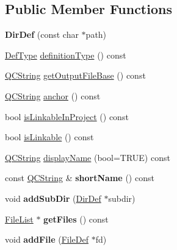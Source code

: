 \subsection*{Public Member Functions}
\begin{DoxyCompactItemize}
\item 
\mbox{\label{class_dir_def_a2f7a368e7ad34ed71796f6a9a696d547}} 
{\bfseries Dir\+Def} (const char $\ast$path)
\item 
\mbox{\hyperlink{class_definition_intf_ada60114bc621669dd8c19edfc6421766}{Def\+Type}} \mbox{\hyperlink{class_dir_def_abd7bc6eb8fd85af099e2d0cb7ad322db}{definition\+Type}} () const
\item 
\mbox{\hyperlink{class_q_c_string}{Q\+C\+String}} \mbox{\hyperlink{class_dir_def_a345c9c6a02715cf7d81315e4154a4a0d}{get\+Output\+File\+Base}} () const
\item 
\mbox{\hyperlink{class_q_c_string}{Q\+C\+String}} \mbox{\hyperlink{class_dir_def_ac28d85c84dbb71901ca49263f65dbdec}{anchor}} () const
\item 
bool \mbox{\hyperlink{class_dir_def_a9d0906d74985d67bbeccc91d7068d99c}{is\+Linkable\+In\+Project}} () const
\item 
bool \mbox{\hyperlink{class_dir_def_a7f8f2ffe405a82ee00982ccf7d1fd750}{is\+Linkable}} () const
\item 
\mbox{\hyperlink{class_q_c_string}{Q\+C\+String}} \mbox{\hyperlink{class_dir_def_a2771a73e6f4be26be57f2c71f097126c}{display\+Name}} (bool=T\+R\+UE) const
\item 
\mbox{\label{class_dir_def_a5626b64fcc8192aa5adc151b03af89f4}} 
const \mbox{\hyperlink{class_q_c_string}{Q\+C\+String}} \& {\bfseries short\+Name} () const
\item 
\mbox{\label{class_dir_def_a104e5839f46ae7804bcc99fe020bc391}} 
void {\bfseries add\+Sub\+Dir} (\mbox{\hyperlink{class_dir_def}{Dir\+Def}} $\ast$subdir)
\item 
\mbox{\label{class_dir_def_a1ae685157d69b8a2d2389bd3580d6bc5}} 
\mbox{\hyperlink{class_file_list}{File\+List}} $\ast$ {\bfseries get\+Files} () const
\item 
\mbox{\label{class_dir_def_ae61d8b61fce7dc841ffa59b1bee07027}} 
void {\bfseries add\+File} (\mbox{\hyperlink{class_file_def}{File\+Def}} $\ast$fd)

\end{DoxyCompactItemize}
